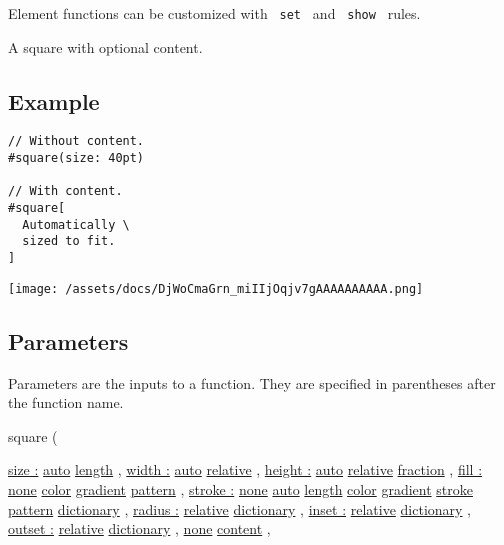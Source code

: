 \label{element-tooltip}
Element functions can be customized with \texttt{\ set\ } and
\texttt{\ show\ } rules.

A square with optional content.

\subsection{Example}\label{example}

\begin{verbatim}
// Without content.
#square(size: 40pt)

// With content.
#square[
  Automatically \
  sized to fit.
]
\end{verbatim}

\texttt{[image: /assets/docs/DjWoCmaGrn\_miIIjOqjv7gAAAAAAAAAA.png]}

\subsection{\texorpdfstring{{ Parameters
}}{ Parameters }}\label{parameters}

\label{parameters-tooltip}
Parameters are the inputs to a function. They are specified in
parentheses after the function name.

{ square } (

{ \hyperref[parameters-size]{size :}
\href{/docs/reference/foundations/auto/}{auto}
\href{/docs/reference/layout/length/}{length} , } {
\hyperref[parameters-width]{width :}
\href{/docs/reference/foundations/auto/}{auto}
\href{/docs/reference/layout/relative/}{relative} , } {
\hyperref[parameters-height]{height :}
\href{/docs/reference/foundations/auto/}{auto}
\href{/docs/reference/layout/relative/}{relative}
\href{/docs/reference/layout/fraction/}{fraction} , } {
\hyperref[parameters-fill]{fill :}
\href{/docs/reference/foundations/none/}{none}
\href{/docs/reference/visualize/color/}{color}
\href{/docs/reference/visualize/gradient/}{gradient}
\href{/docs/reference/visualize/pattern/}{pattern} , } {
\hyperref[parameters-stroke]{stroke :}
\href{/docs/reference/foundations/none/}{none}
\href{/docs/reference/foundations/auto/}{auto}
\href{/docs/reference/layout/length/}{length}
\href{/docs/reference/visualize/color/}{color}
\href{/docs/reference/visualize/gradient/}{gradient}
\href{/docs/reference/visualize/stroke/}{stroke}
\href{/docs/reference/visualize/pattern/}{pattern}
\href{/docs/reference/foundations/dictionary/}{dictionary} , } {
\hyperref[parameters-radius]{radius :}
\href{/docs/reference/layout/relative/}{relative}
\href{/docs/reference/foundations/dictionary/}{dictionary} , } {
\hyperref[parameters-inset]{inset :}
\href{/docs/reference/layout/relative/}{relative}
\href{/docs/reference/foundations/dictionary/}{dictionary} , } {
\hyperref[parameters-outset]{outset :}
\href{/docs/reference/layout/relative/}{relative}
\href{/docs/reference/foundations/dictionary/}{dictionary} , } {
\hyperref[parameters-body]{}
\href{/docs/reference/foundations/none/}{none}
\href{/docs/reference/foundations/content/}{content} , }

